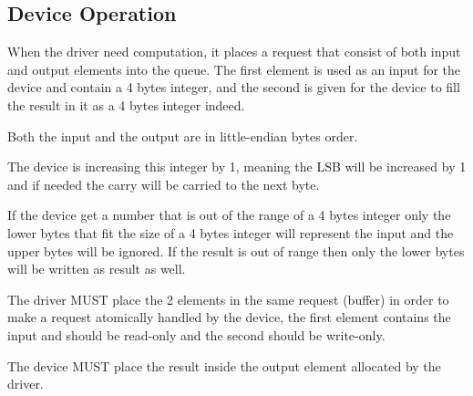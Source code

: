 \subsection{Device Operation}\label{sec:Device Types / Increment-edu Device / Device Operation}

When the driver need computation, it places a request that consist of both
input and output elements into the queue.
The first element is used as an input for the device and contain a 4 bytes
integer, and the second is given for the device to fill the result in it as a
4 bytes integer indeed.

Both the input and the output are in little-endian bytes order.

The device is increasing this integer by 1, meaning the LSB will be
increased by 1 and if needed the carry will be carried to the next byte.

If the device get a number that is out of the range of a 4 bytes integer only
the lower bytes that fit the size of a 4 bytes integer will represent the input
and the upper bytes will be ignored.
If the result is out of range then only the lower bytes will be written as
result as well.


The driver MUST place the 2 elements in the same request (buffer) in order to
make a request atomically handled by the device, the first element contains the
input and should be read-only and the second should be write-only.


The device MUST place the result inside the output element allocated by the
driver.
